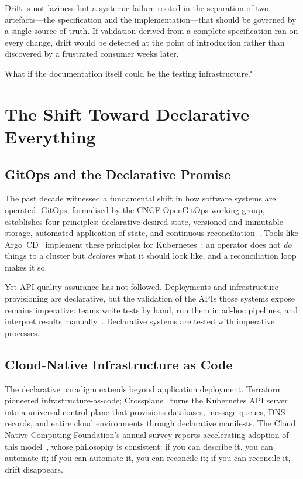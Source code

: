 Drift is not laziness but a systemic failure rooted in the separation of two artefacts---the specification and the implementation---that should be governed by a single source of truth. If validation derived from a complete specification ran on every change, drift would be detected at the point of introduction rather than discovered by a frustrated consumer weeks later.

What if the documentation itself could be the testing infrastructure?

\section{The Shift Toward Declarative Everything}
\label{sec:declarative-shift}

\subsection{GitOps and the Declarative Promise}
\label{subsec:gitops}

The past decade witnessed a fundamental shift in how software systems are operated. GitOps, formalised by the CNCF OpenGitOps working group, establishes four principles: declarative desired state, versioned and immutable storage, automated application of state, and continuous reconciliation~\cite{opengitops}. Tools like Argo~CD~\cite{argocd} implement these principles for Kubernetes~\cite{kubernetes}: an operator does not \textit{do} things to a cluster but \textit{declares} what it should look like, and a reconciliation loop makes it so.

Yet API quality assurance has not followed. Deployments and infrastructure provisioning are declarative, but the validation of the APIs those systems expose remains imperative: teams write tests by hand, run them in ad-hoc pipelines, and interpret results manually~\cite{postman-state-of-api}. Declarative systems are tested with imperative processes.

\subsection{Cloud-Native Infrastructure as Code}
\label{subsec:cloud-native-iac}

The declarative paradigm extends beyond application deployment. Terraform~\cite{terraform} pioneered infrastructure-as-code; Crossplane~\cite{crossplane} turns the Kubernetes API server into a universal control plane that provisions databases, message queues, DNS records, and entire cloud environments through declarative manifests. The Cloud Native Computing Foundation's annual survey reports accelerating adoption of this model~\cite{cncf-survey}, whose philosophy is consistent: if you can describe it, you can automate it; if you can automate it, you can reconcile it; if you can reconcile it, drift disappears.

